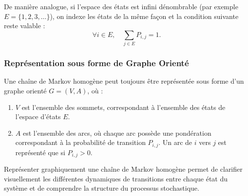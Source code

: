 \documentclass{article}
\begin{document}
De manière analogue, si l'espace des états est infini dénombrable (par exemple $E = \{1, 2, 3, \dots\}$), on indexe les états de la même façon et la condition suivante reste valable :
\[
\forall i \in E, \quad \sum_{j \in E} P_{i,j} = 1.
\]

\subsubsection{Représentation sous forme de Graphe Orienté}
\label{subsubsec: Représentation sous forme de graphe orienté}

\begin{tcolorbox}[colback=white,colframe=red!80!black,title=Graphe Orienté d'une Chaîne de Markov]
Une chaîne de Markov homogène peut toujours être représentée sous forme d'un graphe orienté $ G = (V, A) $, où :
\begin{enumerate}[leftmargin=5em, label=(\arabic*)]
    \item $V$ est l'ensemble des sommets, correspondant à l'ensemble des états de l'espace d'états $E$.
    \item $A$ est l'ensemble des arcs, où chaque arc possède une pondération correspondant à la probabilité de transition $P_{i,j}$. Un arc de $i$ vers $j$ est représenté que si $P_{i,j} > 0$.
\end{enumerate}
\end{tcolorbox}

Représenter graphiquement une chaîne de Markov homogène permet de clarifier visuellement les différentes dynamiques de transitions entre chaque état du système et de comprendre la structure du processus stochastique. \\
\end{document}
